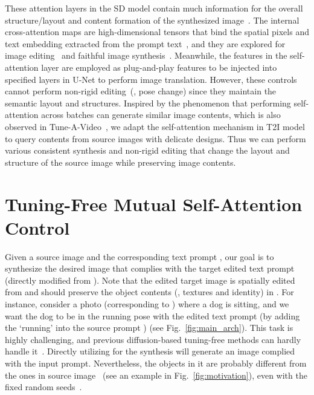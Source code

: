 \documentclass[10pt,twocolumn,letterpaper]{article}
\begin{document}
These attention layers in the SD model contain much information for the overall structure/layout and content formation of the synthesized image~\cite{hertz2022prompt, tumanyan2022plug}. The internal cross-attention maps are high-dimensional tensors that bind the spatial pixels and text embedding extracted from the prompt text~\cite{hertz2022prompt}, and they are explored for image editing~\cite{hertz2022prompt} and faithful image synthesis~\cite{chefer2023attend}. Meanwhile, the features in the self-attention layer are employed as plug-and-play features to be injected into specified layers in U-Net to perform image translation. However, these controls cannot perform non-rigid editing~(\eg, pose change) since they maintain the semantic layout and structures. 
Inspired by the phenomenon that performing self-attention across batches can generate similar image contents, which is also observed in Tune-A-Video~\cite{wu2022tune}, we adapt the self-attention mechanism in T2I model to query contents from source images with delicate designs. Thus we can perform various consistent synthesis and non-rigid editing that change the layout and structure of the source image while preserving image contents. 



\section{Tuning-Free Mutual Self-Attention Control}
Given a source image  and the corresponding text prompt , our goal is to synthesize the desired image  that complies with the target edited text prompt  (directly modified from ). Note that the edited target image  is spatially edited from  and should preserve the object contents (\eg, textures and identity) in . For instance, consider a photo (corresponding to ) where a dog is sitting, and we want the dog to be in the running pose with the edited text prompt  (by adding the `running' into the source prompt ) (see Fig.~\ref{fig:main_arch}). This task is highly challenging, and previous diffusion-based tuning-free methods can hardly handle it~\cite{hertz2022prompt, tumanyan2022plug}. Directly utilizing  for the synthesis will generate an image  complied with the input prompt. Nevertheless, the objects in it are probably different from the ones in source image ~(see an example in Fig.~\ref{fig:motivation}), even with the fixed random seeds~\cite{hertz2022prompt}. 
\end{document}
